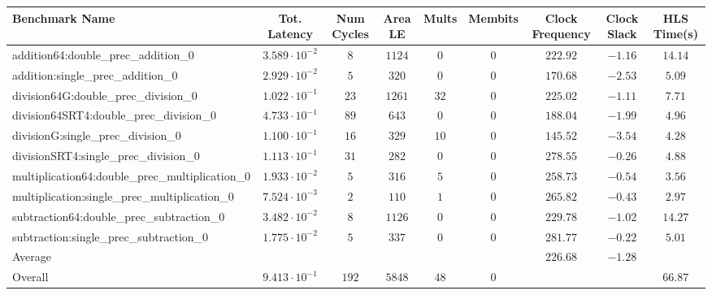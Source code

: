 \begin{tabular}{|l|c|c|c|c|c|c|c|c|}
\hline
Benchmark Name                                   & Tot. Latency            & Num Cycles & Area LE  & Mults  & Membits & Clock Frequency & Clock Slack & HLS Time(s) \\
\hline
addition64:double\_prec\_addition\_0             & $ 3.589 \cdot 10^{-2} $ & $ 8      $ & $ 1124 $ & $ 0  $ & $ 0   $ & $ 222.92      $ & $ -1.16   $ & $ 14.14   $ \\
addition:single\_prec\_addition\_0               & $ 2.929 \cdot 10^{-2} $ & $ 5      $ & $ 320  $ & $ 0  $ & $ 0   $ & $ 170.68      $ & $ -2.53   $ & $ 5.09    $ \\
division64G:double\_prec\_division\_0            & $ 1.022 \cdot 10^{-1} $ & $ 23     $ & $ 1261 $ & $ 32 $ & $ 0   $ & $ 225.02      $ & $ -1.11   $ & $ 7.71    $ \\
division64SRT4:double\_prec\_division\_0         & $ 4.733 \cdot 10^{-1} $ & $ 89     $ & $ 643  $ & $ 0  $ & $ 0   $ & $ 188.04      $ & $ -1.99   $ & $ 4.96    $ \\
divisionG:single\_prec\_division\_0              & $ 1.100 \cdot 10^{-1} $ & $ 16     $ & $ 329  $ & $ 10 $ & $ 0   $ & $ 145.52      $ & $ -3.54   $ & $ 4.28    $ \\
divisionSRT4:single\_prec\_division\_0           & $ 1.113 \cdot 10^{-1} $ & $ 31     $ & $ 282  $ & $ 0  $ & $ 0   $ & $ 278.55      $ & $ -0.26   $ & $ 4.88    $ \\
multiplication64:double\_prec\_multiplication\_0 & $ 1.933 \cdot 10^{-2} $ & $ 5      $ & $ 316  $ & $ 5  $ & $ 0   $ & $ 258.73      $ & $ -0.54   $ & $ 3.56    $ \\
multiplication:single\_prec\_multiplication\_0   & $ 7.524 \cdot 10^{-3} $ & $ 2      $ & $ 110  $ & $ 1  $ & $ 0   $ & $ 265.82      $ & $ -0.43   $ & $ 2.97    $ \\
subtraction64:double\_prec\_subtraction\_0       & $ 3.482 \cdot 10^{-2} $ & $ 8      $ & $ 1126 $ & $ 0  $ & $ 0   $ & $ 229.78      $ & $ -1.02   $ & $ 14.27   $ \\
subtraction:single\_prec\_subtraction\_0         & $ 1.775 \cdot 10^{-2} $ & $ 5      $ & $ 337  $ & $ 0  $ & $ 0   $ & $ 281.77      $ & $ -0.22   $ & $ 5.01    $ \\
\hline
Average                                          & $                     $ & $        $ & $      $ & $    $ & $     $ & $ 226.68      $ & $ -1.28   $ & $         $ \\
\hline
Overall                                          & $ 9.413 \cdot 10^{-1} $ & $ 192    $ & $ 5848 $ & $ 48 $ & $ 0   $ & $             $ & $         $ & $ 66.87   $ \\
\hline
\end{tabular}
